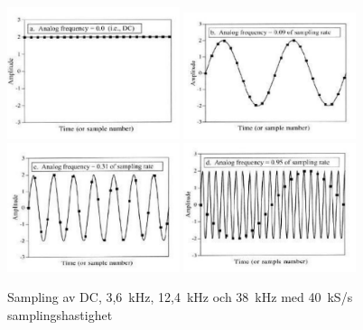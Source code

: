 \begin{figure}
\begin{center}
\includegraphics[width=0.45\textwidth]{images/cropped_pdfs/bild_2_1-38.pdf}
\includegraphics[width=0.45\textwidth]{images/cropped_pdfs/bild_2_1-39.pdf}
\includegraphics[width=0.45\textwidth]{images/cropped_pdfs/bild_2_1-40.pdf}
\includegraphics[width=0.45\textwidth]{images/cropped_pdfs/bild_2_1-41.pdf}
\caption{Sampling av DC, 3,6~kHz, 12,4~kHz och 38~kHz med 40~kS/s samplingshastighet}
\label{fig:BildII1-38}
\end{center}
\end{figure}

